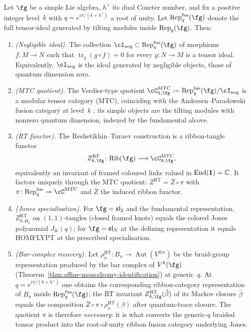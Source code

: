 \begin{proposition}
\label{prop:rt-functor-via-negligible-quotient}
Let $\fg$ be a simple Lie algebra, $h^\vee$ its dual Coxeter number, and fix a positive integer level~$k$ with $q = e^{i\pi/(k+h^\vee)}$ a root of unity. Let $\mathrm{Rep}_q^{\mathrm{fus}}(\fg)$ denote the full tensor-ideal generated by tilting modules inside $\mathrm{Rep}_q(\fg)$. Then:
\begin{enumerate}[label=\textup{(\roman*)}]
 \item \emph{(Negligible ideal).} The collection $\cI_{\mathrm{neg}} \subset \mathrm{Rep}_q^{\mathrm{fus}}(\fg)$ of morphisms $f \colon M \to N$ such that $\operatorname{tr}_q(g \circ f) = 0$ for every $g \colon N \to M$ is a tensor ideal. Equivalently, $\cI_{\mathrm{neg}}$ is the ideal generated by negligible objects, those of quantum dimension zero.
 \item \emph{(MTC quotient).} The Verdier-type quotient $\cC^{\mathrm{MTC}}_{k,\fg} := \mathrm{Rep}_q^{\mathrm{fus}}(\fg) / \cI_{\mathrm{neg}}$ is a modular tensor category (MTC), coinciding with the Andersen--Paradowski fusion category at level~$k$ \cite{And92,AP95}; its simple objects are the tilting modules with nonzero quantum dimension, indexed by the fundamental alcove.
 \item \emph{(RT functor).} The Reshetikhin--Turaev construction \cite{RT90} is a ribbon-tangle functor
 \[
 Z^{\mathrm{RT}}_{k,\fg} \colon \mathrm{Rib}(\fg) \longrightarrow \cC^{\mathrm{MTC}}_{k,\fg},
 \]
 equivalently an invariant of framed coloured links valued in $\operatorname{End}(\mathbf{1}) = \mathbb C$. It factors uniquely through the MTC quotient: $Z^{\mathrm{RT}} = \bar{Z} \circ \pi$ with $\pi \colon \mathrm{Rep}_q^{\mathrm{fus}} \twoheadrightarrow \cC^{\mathrm{MTC}}$ and $\bar{Z}$ the induced ribbon functor.
 \item \emph{(Jones specialisation).} For $\fg = \mathfrak{sl}_2$ and the fundamental representation, $Z^{\mathrm{RT}}_{k,\mathfrak{sl}_2}$ on $(1,1)$-tangles (closed framed knots) equals the colored Jones polynomial $J_K(q)$; for $\fg = \mathfrak{sl}_N$ at the defining representation it equals HOMFLYPT at the prescribed specialisation.
 \item \emph{(Bar-complex recovery).} Let $\rho_n^{\mathrm{HT}} \colon B_n \to \operatorname{Aut}(V^{\otimes n})$ be the braid-group representation produced by the bar complex of $V^k(\fg)$ (Theorem~\ref{thm:affine-monodromy-identification}) at generic~$q$. At $q = e^{i\pi/(k+h^\vee)}$ one obtains the corresponding ribbon-category representation of $B_n$ inside $\mathrm{Rep}_q^{\mathrm{fus}}(\fg)$; the RT invariant $Z^{\mathrm{RT}}_{k,\fg}(\hat{\beta})$ of its Markov closure $\hat{\beta}$ equals the composition $\bar{Z} \circ \pi \circ \rho_n^{\mathrm{HT}}(\beta)$ after quantum-trace closure. The quotient $\pi$ is therefore \emph{necessary}: it is what converts the generic-$q$ braided tensor product into the root-of-unity ribbon fusion category underlying Jones.
\end{enumerate}
\end{proposition}

